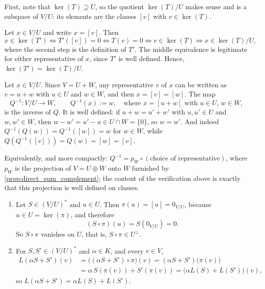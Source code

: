 \begin{exercisesolution}
\label{sol:kernel_induced_map}
First, note that $\ker(T) \supseteq U$, so the quotient $\ker(T)/U$ makes sense and is a subspace of $V/U$: its elements are the classes $[v]$ with $v \in \ker(T)$.

Let $x \in V/U$ and write $x = [v]$. Then
\[
x \in \ker(T') \iff T'([v]) = 0 \iff T(v) = 0 \iff v \in \ker(T) \iff x \in \ker(T)/U,
\]
where the second step is the definition of $T'$. The middle equivalence is legitimate for either representative of $x$, since $T'$ is well defined. Hence, $\ker(T') = \ker(T)/U$.
\end{exercisesolution}

\begin{exercisesolution}
\label{sol:inverse_from_complement}
Let $x \in V/U$. Since $V = U + W$, any representative $v$ of $x$ can be written as $v = u + w$ with $u \in U$ and $w \in W$, and then $x = [v] = [w]$. The map
\[
Q^{-1} \colon V/U \to W, \qquad Q^{-1}(x) := w, \quad \text{where } x = [u + w] \text{ with } u \in U, \, w \in W,
\]
is the inverse of $Q$. It is well defined: if $u + w = u' + w'$ with $u,u' \in U$ and $w,w' \in W$, then $w - w' = u' - u \in U \cap W = \{0\}$, so $w = w'$. And indeed $Q^{-1}(Q(w)) = Q^{-1}([w]) = w$ for $w \in W$, while $Q(Q^{-1}([v])) = Q(w) = [w] = [v]$.

Equivalently, and more compactly: $Q^{-1} = p_W \circ (\text{choice of representative})$, where $p_W$ is the projection of $V = U \oplus W$ onto $W$ furnished by \cref{prop:direct_sum_complement}; the content of the verification above is exactly that this projection is well defined on classes.
\end{exercisesolution}

\begin{exercisesolution}
\label{sol:annihilator_L}
\begin{enumerate}[label=\textbf{(\alph*)}]
    \item Let $S \in (V/U)^*$ and $u \in U$. Then $\pi(u) = [u] = 0_{V/U}$, because $u \in U = \ker(\pi)$, and therefore
    \[
    (S \circ \pi)(u) = S(0_{V/U}) = 0.
    \]
    So $S \circ \pi$ vanishes on $U$, that is, $S \circ \pi \in U^\perp$.
    \item For $S, S' \in (V/U)^*$ and $\alpha \in K$, and every $v \in V$,
    \begin{align*}
    L(\alpha S + S')(v) &= \big((\alpha S + S') \circ \pi\big)(v) = (\alpha S + S')\big(\pi(v)\big) \\
    &= \alpha \, S(\pi(v)) + S'(\pi(v)) = \big(\alpha L(S) + L(S')\big)(v),
    \end{align*}
    so $L(\alpha S + S') = \alpha L(S) + L(S')$. \qedhere
\end{enumerate}
\end{exercisesolution}

